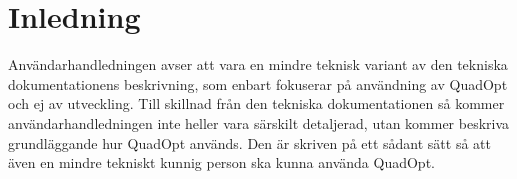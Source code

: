 \section{Inledning}
Användarhandledningen avser att vara en mindre teknisk variant av den tekniska dokumentationens beskrivning, som enbart fokuserar på användning av QuadOpt och ej av utveckling. Till skillnad från den tekniska dokumentationen så kommer användarhandledningen inte heller vara särskilt detaljerad, utan kommer beskriva grundläggande hur QuadOpt används. Den är skriven på ett sådant sätt så att även en mindre tekniskt kunnig person ska kunna använda QuadOpt.